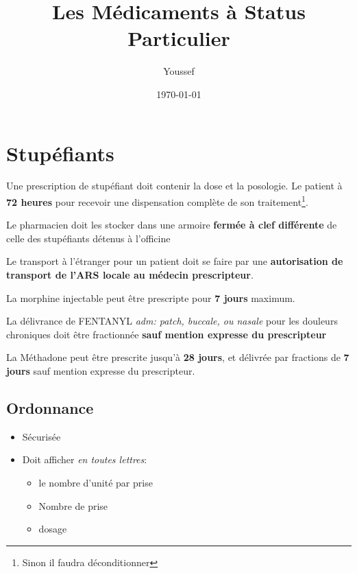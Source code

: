 \documentclass[11pt]{article}
\author{Youssef}
\date{\today}
\title{Les Médicaments à Status Particulier}
\begin{document}
\maketitle
\tableofcontents

\setlength{\parindent}{0pt}

\section{Stupéfiants}
\label{sec:orgbbf85bd}
Une prescription de stupéfiant doit contenir la dose et la posologie.
Le patient à \textbf{72 heures} pour recevoir une dispensation complète de son traitement\footnote{Sinon il faudra déconditionner}.

Le pharmacien doit les stocker dans une armoire \textbf{fermée à clef différente} de celle des stupéfiants détenus à l'officine

Le transport à l'étranger pour un patient doit se faire par une \textbf{autorisation de transport de l'ARS locale au médecin prescripteur}.

La morphine injectable peut être prescripte pour \textbf{7 jours} maximum.

La délivrance de FENTANYL \emph{adm: patch, buccale, ou nasale} pour les douleurs chroniques doit être fractionnée \textbf{sauf mention expresse du prescripteur}

La Méthadone peut être prescrite jusqu'à \textbf{28 jours}, et délivrée par fractions de \textbf{7 jours} sauf mention expresse du prescripteur.

\subsection{Ordonnance}
\label{sec:org0e06452}
\begin{itemize}
\item Sécurisée
\item Doit afficher \emph{en toutes lettres}:
\begin{itemize}
\item le nombre d'unité par prise
\item Nombre de prise
\item dosage
\end{itemize}
\end{itemize}
\end{document}
